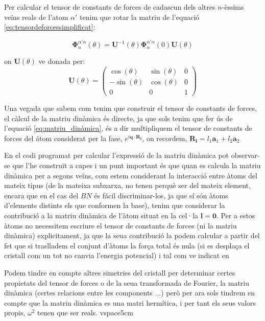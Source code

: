 \documentclass[12pt]{article} %
\let\vec\mathbf %
\begin{document}
Per calcular el tensor de constants de forces de cadascun dels altres $n$-èssims veïns reals de l'atom $\alpha'$ tenim que rotar la matriu de l'equació \ref{eq:tensordeforcessimplificat}:

\begin{equation}
 \vec\Phi_n^{\alpha'\alpha}(\theta)=\vec U^{-1}(\theta)\vec\Phi_n^{\alpha'\alpha}(0)\vec U(\theta)
\end{equation}


on $\vec U(\theta)$ ve donada per:
\begin{equation}
\vec U(\theta)=
\begin{pmatrix}
\cos(\theta)  & \sin(\theta) & 0 \\
-\sin(\theta) & \cos(\theta) & 0  \\
0             & 0            & 1
\end{pmatrix}
\end{equation}


Una vegada que sabem com tenim que construir el tensor de constants de forces, el càlcul de la matriu dinàmica és directe, ja que sols tenim que fer ús de l'equació \ref{eq:matriu_dinàmica}, és a dir multipliquem el tensor de constants de forces del átom considerat per la fase, $e^{i \vec q\cdot \vec R_\vec l}$, on recordem, $\vec R_\vec l=l_1 \vec a_1+ l_2 \vec a_2$

En el codi programat per calcular l'expressió de la matriu dinàmica pot observar-se que l'he construït a capes i un punt important és que quan es calcula la matriu dinàmica per a segons veïns, com estem considerant la interacció entre àtoms del mateix tipus (de la mateixa subxarxa, no tenen perquè ser del mateix element, encara que en el cas del $BN$ és fácil discriminar-los, ja que sí són àtoms d'elements distints els que conformen la base), tenim que considerar la contribució a la matriu dinàmica de l'àtom situat en la cel·la $\vec l=\vec 0$. Per a estos àtoms no necessitem escriure el tensor de constants de forces (ni la matriu dinàmica) explicitament, ja que la seua contribució la podem calcular a partir del fet que si traslladem el conjunt d'àtoms la força total és nula (si es desplaça el cristall com un tot no canvia l'energia potencial) i tal com ve indicat en \cite{falkovsky08_symmet_const_phonon_disper_graph}

Podem tindre en compte altres simetries del cristall per determinar certes propietats del tensor de forces o de la seua transformada de Fourier, la matriu dinàmica (certes relacions entre les components ...) però per ara sols tindrem en compte que la matriu dinàmica es una matri hermítica, i per tant els seus valors propis, $\omega^2$ tenen que ser reals.
vspace{5cm}
\end{document}
